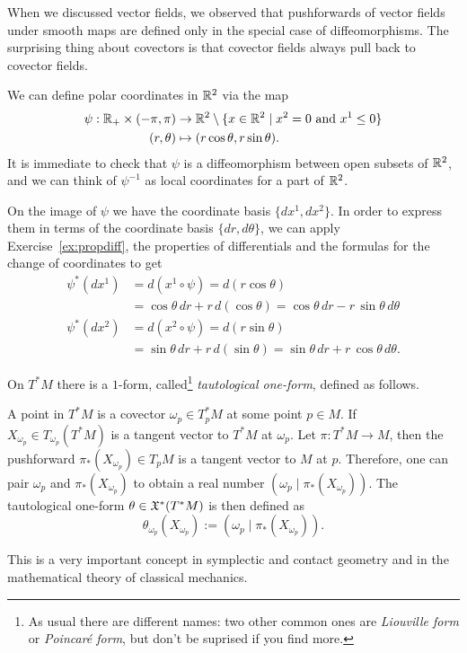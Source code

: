 When we discussed vector fields, we observed that pushforwards of vector fields under smooth maps are defined only in the special case of diffeomorphisms.
The surprising thing about covectors is that covector fields always pull back to covector fields.

\begin{example}
	We can define polar coordinates in $\mathbb{R}^2$ via the map
	\begin{align}
		\psi : \mathbb{R}_+\times (-\pi, \pi) & \to \mathbb{R}^2\setminus\{x\in\mathbb{R}^2\mid x^2=0 \mbox{ and } x^1 \leq 0\} \\
		(r, \theta)                   & \mapsto (r\cos\theta, r\sin\theta).
	\end{align}
	It is immediate to check that $\psi$ is a diffeomorphism between open subsets of $\mathbb{R}^2$, and we can think of $\psi^{-1}$ as local coordinates for a part of $\mathbb{R}^2$.

	On the image of $\psi$ we have the coordinate basis $\{dx^1, dx^2\}$. In order to express them in terms of the coordinate basis $\{dr,d\theta\}$, we can apply Exercise~\ref{ex:propdiff}, the properties of differentials and the formulas for the change of coordinates to get
	\begin{align}
		\psi^*(d x^1) & = d(x^1\circ \psi) = d(r\cos\theta)                                            \\
		              & = \cos\theta \,dr +r\,d(\cos\theta) = \cos\theta \,dr -r\,\sin\theta\,d\theta  \\
		\psi^*(d x^2) & = d(x^2\circ \psi) = d(r\sin\theta)                                            \\
		              & = \sin\theta \,dr +r\,d(\sin\theta) = \sin\theta \,dr +r\,\cos\theta\,d\theta.
	\end{align}
\end{example}

\begin{example}
	On $T^*M$ there is a $1$-form, called\footnote{As usual there are different names: two other common ones are \emph{Liouville form} or \emph{Poincar\'e form}, but don't be suprised if you find more.} \emph{tautological one-form}, defined as follows.

	A point in $T^*M$ is a covector $\omega_p\in T^*_p M$ at some point $p\in M$. If $X_{\omega_p}\in T_{\omega_p}(T^*M)$ is a tangent vector to $T^*M$ at $\omega_p$. Let $\pi:T^*M \to M$, then the pushforward $\pi_*(X_{\omega_p})\in T_p M$ is a tangent vector to $M$ at $p$.
	Therefore, one can pair $\omega_p$ and $\pi_*(X_{\omega_p})$ to obtain a real number $\left(\omega_p\;\big|\;\pi_*(X_{\omega_p})\right)$.
	The tautological one-form $\theta\in\mathfrak{X}^*(T^*M)$ is then defined as
	\begin{equation}
		\theta_{\omega_p}(X_{\omega_p}) := \left(\omega_p\;\Big|\;\pi_*(X_{\omega_p})\right).
	\end{equation}

	This is a very important concept in symplectic and contact geometry and in the mathematical theory of classical mechanics.
\end{example}

